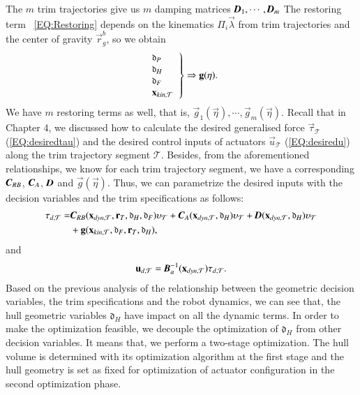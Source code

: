 The $m$ trim trajectories give us $m$ damping matrices $\emph{\textbf{D}}_{1}, \cdots, \emph{\textbf{D}}_{m}$
The restoring term ~\ref{EQ:Restoring} depends on the kinematics $\Pi_{i}\vec{\lambda}$ from trim trajectories and the center of gravity $\vec{r}_{g}^{b}$, so we obtain
\begin{align}
\left.\begin{tabular}{l}
$\mathfrak{d}_{P}$ \\
$\mathfrak{d}_{H}$ \\
$\mathfrak{d}_{F}$ \\
$\vec{x}_{kin,\mathcal{T}}$
\end{tabular}\right\}\Rightarrow \vec{g}(\vec{\eta}).
\label{EQ:DynamikRelationship6}
\end{align}
We have $m$ restoring terms as well, that is, $\vec{g}_{1}(\vec{\eta}), \cdots, \vec{g}_{m}(\vec{\eta})$.
Recall that in Chapter 4, we discussed how to calculate the desired generalised force $\vec{\tau}_{\mathcal{T}}$ (\ref{EQ:desiredtau}) and the desired control inputs of actuators $\vec{u}_{\mathcal{T}}$ (\ref{EQ:desiredu}) along the trim trajectory segment $\mathcal{T}$. Besides, from the aforementioned relationships, we know for each trim trajectory segment, we have a corresponding $\emph{\textbf{C}}_{RB}$, $\emph{\textbf{C}}_{A}$, $\emph{\textbf{D}}$ and $\vec{g}(\vec{\eta})$. Thus, we can parametrize the desired inputs with the decision variables and the trim specifications as follows:
\begin{align}
\vec{\tau}_{d,\mathcal{T}}=&\emph{\textbf{C}}_{RB}(\vec{x}_{dyn,\mathcal{T}},\vec{r}_{T},\mathfrak{d}_{H},\mathfrak{d}_{F})\vec{\upsilon}_{\mathcal{T}}+ 
\emph{\textbf{C}}_{A}(\vec{x}_{dyn,\mathcal{T}},\mathfrak{d}_{H})\vec{\upsilon}_{\mathcal{T}}+\emph{\textbf{D}}(\vec{x}_{dyn,\mathcal{T}},\mathfrak{d}_{H})\vec{\upsilon}_{\mathcal{T}} \nonumber \\
&+\vec{g}(\vec{x}_{kin,\mathcal{T}},\mathfrak{d}_{F},\vec{r}_{T},\mathfrak{d}_{H}),
\end{align}
and 
\begin{align}
\vec{u}_{d,\mathcal{T}}=\emph{\textbf{B}}_{a}^{-1}(\vec{x}_{dyn,\mathcal{T}})\vec{\tau}_{d,\mathcal{T}}. \label{EQ:UTrimDesired}
\end{align}
Based on the previous analysis of the relationship between the geometric decision variables, the trim specifications and the robot dynamics, we can see that, the hull geometric variables $\mathfrak{d}_{H}$ have impact on all the dynamic terms. In order to make the optimization feasible, we decouple the optimization of $\mathfrak{d}_{H}$ from other decision variables. It means that, we perform a two-stage optimization. The hull volume is determined with its optimization algorithm at the first stage and the hull geometry is set as fixed for optimization of actuator configuration in the second optimization phase.
